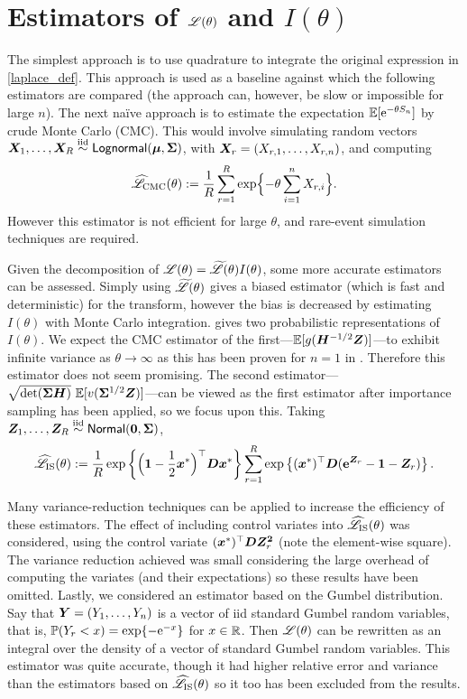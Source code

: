 \section{Estimators of $\mathscr{L}(\theta)$ and $I(\theta)$}\label{S:Laplace}

The simplest approach is to use quadrature to integrate the original expression in
\eqref{laplace_def}. This approach is used as a baseline against which the
following estimators are compared (the approach can, however,  be slow or
impossible for large $n$). The next na{\"i}ve approach is to estimate the
expectation $\operatorname{{\mathbb E}}[\mathrm{e}^{-\theta S_n}]$ by crude Monte Carlo (CMC). This would
involve simulating random vectors $\bm{X}_1, \dots, \bm{X}_R \overset{\smash{\mathrm{iid}}}{\sim} \mathsf{Lognormal}(\bm{\mu},
\bm{\Sigma})$, with $\bm{X}_r = (X_{r,1}, \dots, X_{r,n})$, and computing
%
\[ \widehat{\mathscr{L}}_{\mathrm{CMC}}(\theta) := \frac{1}{R} \sum_{r=1}^R
  \exp\Bigl\{-\theta \sum_{i=1}^n X_{r,i}\Bigr\}. \]
%
However this estimator is not efficient for large $\theta$, and rare-event
simulation techniques are required.

Given the decomposition of $\mathscr{L}(\theta) = \widetilde{\mathscr{L}}(\theta)
I(\theta)$, some more accurate estimators can be assessed. Simply using
$\widetilde{\mathscr{L}}(\theta)$ gives a biased estimator (which is fast and
deterministic) for the transform, however the bias is decreased by estimating
$I(\theta)$ with Monte Carlo integration.  gives
two probabilistic representations of $I(\theta)$. We expect the CMC estimator
of the first---$\operatorname{{\mathbb E}}[g(\bm{H}^{-1/2}\bm{Z})
]$---to exhibit infinite variance as $\theta \to \infty$ as this has been
proven for $n=1$ in \cite{asmussen2014laplace}. Therefore this estimator does
not seem promising. The second estimator---$\sqrt{\det(\bm{\Sigma}
  \bm{H})} \, \operatorname{{\mathbb E}}[ v(\bm{\Sigma}^{1/2} \bm{Z}) ]$---can be viewed as the first
estimator after importance sampling has been applied, so we focus upon
this. Taking $\bm{Z}_1, \dots, \bm{Z}_R \overset{\smash{\mathrm{iid}}}{\sim} \mathsf{Normal}(\bm{0}, \bm{\Sigma})$,
%
\[ \widehat{\mathscr{L}}_{\mathrm{IS}}(\theta) := \frac{1}{R}
  \exp\left\{ \Bigl(\bm{1} - \frac12 \bm{x}^* \Bigr)^\top \bm{D} \bm{x}^* \right\}
  \sum_{r=1}^R \exp\left\{ (\bm{x}^*)^\top \bm{D} (\text{\bf{e}}^{\bm{Z}_r} - \bm{1} - \bm{Z}_r)
  \right\}. \]

Many variance-reduction techniques can be applied to increase the efficiency
of these estimators. The effect of including control variates into
$\widehat{\mathscr{L}}_{\mathrm{IS}}(\theta)$ was considered, using the control
variate $(\bm{x}^*)^\top \bm{D} \bm{Z}_r^{\bm{2}}$ (note the element-wise square). The
variance reduction achieved was small considering the large overhead of
computing the variates (and their expectations) so these results have been
omitted. Lastly, we considered an estimator based on the Gumbel
distribution. Say that $\bm{Y} = (Y_1, \dots, Y_n)$ is a vector of iid standard
Gumbel random variables, that is, $\operatorname{{\mathbb P}}(Y_r < x) = \exp\{ -\mathrm{e}^{-x} \}$ for
$x \in \mathbb{R}$. Then $\mathscr{L}(\theta)$ can be rewritten as an integral over the
density of a vector of standard Gumbel random variables. This estimator was
quite accurate, though it had higher relative error and variance than the
estimators based on $\widehat{\mathscr{L}}_{\mathrm{IS}}(\theta)$ so it too has
been excluded from the results.

